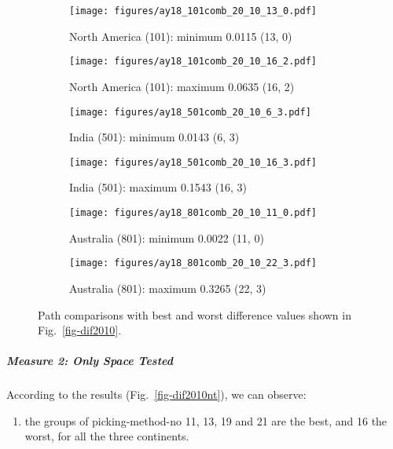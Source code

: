 \begin{figure*}
	\centering
	\begin{subfigure}{.43\textwidth}
		\texttt{[image: figures/ay18\_101comb\_20\_10\_13\_0.pdf]}
		\caption{North America (101): minimum 0.0115 (13, 0)}\label{fig-nac-2010130}
	\end{subfigure}
	\begin{subfigure}{.43\textwidth}
		\texttt{[image: figures/ay18\_101comb\_20\_10\_16\_2.pdf]}
		\caption{North America (101): maximum 0.0635 (16, 2)}\label{fig-nac-2010162}
	\end{subfigure}
	\vspace{.1em}
	\begin{subfigure}{.43\textwidth}
		\texttt{[image: figures/ay18\_501comb\_20\_10\_6\_3.pdf]}
		\caption{India (501): minimum 0.0143 (6, 3)}\label{fig-ind-201063}
	\end{subfigure}
	\begin{subfigure}{.43\textwidth}
		\texttt{[image: figures/ay18\_501comb\_20\_10\_16\_3.pdf]}
		\caption{India (501): maximum 0.1543 (16, 3)}\label{fig-ind-2010163}
	\end{subfigure}
	\vspace{.1em}
	\begin{subfigure}{.43\textwidth}
		\texttt{[image: figures/ay18\_801comb\_20\_10\_11\_0.pdf]}
		\caption{Australia (801): minimum 0.0022 (11, 0)}\label{fig-au-2010110}
	\end{subfigure}
	\begin{subfigure}{.43\textwidth}
		\texttt{[image: figures/ay18\_801comb\_20\_10\_22\_3.pdf]}
		\caption{Australia (801): maximum 0.3265 (22, 3)}\label{fig-au-2010223}
	\end{subfigure}
	\caption[Best and worst differences with test (20 Myr bin, 10 Myr
step)]{Path comparisons with best and worst difference values shown in
Fig.~\ref{fig-dif2010}.}\label{fig-dif2010bw}
\end{figure*}

\subparagraph{Measure 2: Only Space Tested}

According to the results (Fig.~\ref{fig-dif2010nt}), we can observe:
%
\begin{enumerate}
  \item the groups of picking-method-no 11, 13, 19 and 21 are the best, and 16
        the worst, for all the three continents.
\end{enumerate}

